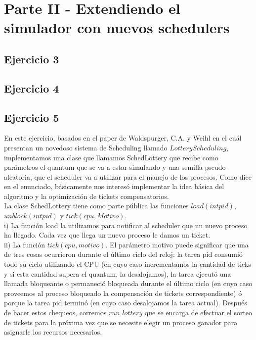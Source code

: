 \documentclass[a4paper]{article}
\begin{document}
\section{Parte II - Extendiendo el simulador con nuevos schedulers}

\subsection{Ejercicio 3}
\subsection{Ejercicio 4}
\subsection{Ejercicio 5}
En este ejercicio, basados en el paper de Waldspurger, C.A. y Weihl en el cu\'al presentan un 
novedoso sistema de Scheduling llamado $Lottery Scheduling$, implementamos una clase que llamamos
SchedLottery que recibe como par\'ametros el quantum que se va a estar simulando y una semilla 
pseudo-aleatoria, que el scheduler va a utilizar para el manejo de los procesos. Como dice en el
enunciado, b\'asicamente nos interes\'o implementar la idea b\'asica del algoritmo y la 
optimizaci\'on de tickets compensatorios. \\
La clase SchedLottery tiene como parte p\'ublica las funciones $load(int pid)$, $unblock(int pid)$ 
y $tick(cpu, Motivo)$. \\
i) La funci\'on load la utilizamos para notificar al scheduler
que un nuevo proceso ha llegado. Cada vez que llega un nuevo proceso le damos un ticket. \\
ii) La funci\'on
$tick(cpu, motivo)$. El par\'ametro motivo puede significar que una de tres cosas
ocurrieron durante el \'ultimo ciclo del reloj: la tarea pid consumi\'o todo su
ciclo utilizando el CPU (en cuyo caso incrementamos la cantidad de ticks y si esta cantidad supera el
quantum, la desalojamos), la tarea ejecut\'o una llamada bloqueante o permaneci\'o 
bloqueada durante el \'ultimo ciclo (en cuyo caso proveemos al proceso bloqueado la compensaci\'on 
de tickets correspondiente) \'o porque la tarea pid termin\'o (en cuyo caso desalojamos la tarea
actual). Despu\'es de hacer estos chequeos, corremos $run\_lottery$ que se encarga de efectuar el 
sorteo de tickets para la pr\'oxima vez que se necesite elegir un proceso ganador para asignarle 
los recursos necesarios. \\
\end{document}

